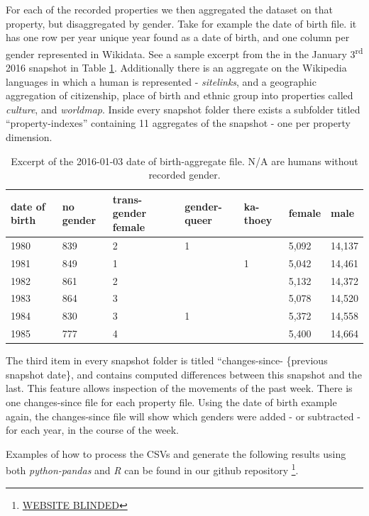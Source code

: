 \documentclass[letterpaper]{article}
\begin{document}
For each of the recorded properties we then aggregated the dataset on that property, but disaggregated by gender. Take for example the date of birth file. it has one row per year unique year found as a date of birth, and one column per gender represented in Wikidata. See a sample excerpt from the in the January 3\textsuperscript{rd} 2016 snapshot in Table \ref{table:dob}. Additionally there is an aggregate on the Wikipedia languages in which a human is represented - \textit{sitelinks}, and a geographic aggregation of citizenship, place of birth and ethnic group into properties called \textit{culture}, and \textit{worldmap}. Inside every snapshot folder there exists a subfolder titled ``property-indexes'' containing 11 aggregates of the snapshot - one per property dimension.
 
\begin{table}
\caption{Excerpt of the 2016-01-03 date of birth-aggregate file. N/A are humans without recorded gender.}
\begin{tabular} {p{0.8cm}p{0.8cm}p{0.8cm}p{0.8cm}p{0.8cm}p{0.8cm}p{0.8cm}}
\toprule
date of birth & no gender & trans-gender female & gender-queer & ka-thoey & female & male \\
\midrule
1980 & 839 & 2 & 1 & & 5,092 & 14,137   \\ 
1981 & 849 & 1 &  & 1 &5,042 & 14,461 \\ 
1982 & 861 & 2 &  & &5,132 & 14,372  \\ 
1983 & 864 & 3 &  & &5,078 & 14,520  \\ 
1984 & 830 & 3 & 1 & &5,372 & 14,558   \\ 
1985 & 777 & 4 &  & &5,400 & 14,664  \\ 
\bottomrule
\end{tabular}
\label{table:dob}
\end{table}

The third item in every snapshot folder is titled ``changes-since- \{previous snapshot date\}, and contains computed differences between this snapshot and the last. This feature allows inspection of the movements of the past week. There is one changes-since file for each property file. Using the date of birth example again, the changes-since file will show which genders were added - or subtracted - for each year, in the course of the week.

Examples of how to process the CSVs and generate the following results using both \textit{python-pandas} and \textit{R} can be found in our github repository \footnote{\url{WEBSITE BLINDED}}.
\end{document}
